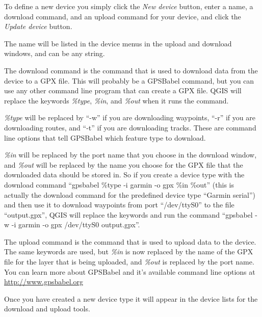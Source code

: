 To define a new device you simply click the \emph{New device} button,
enter a name, a download command, and an upload command for your device,
and click the \emph{Update device} button. 

The name will be listed in the device menus in the upload and download
windows, and can be any string. 

The download command is the command that is used to download data
from the device to a GPX file. This will probably be a GPSBabel command,
but you can use any other command line program that can create a GPX
file. QGIS will replace the keywords \emph{\%type}, \emph{\%in}, and
\emph{\%out} when it runs the command.

\emph{\%type} will be replaced by {}``-w'' if you are downloading
waypoints, {}``-r'' if you are downloading routes, and {}``-t''
if you are downloading tracks. These are command line options that
tell GPSBabel which feature type to download. 

\emph{\%in} will be replaced by the port name that you choose in the
download window, and \emph{\%out} will be replaced by the name you
choose for the GPX file that the downloaded data should be stored
in. So if you create a device type with the download command {}``gpsbabel
\%type -i garmin -o gpx \%in \%out'' (this is actually the download
command for the predefined device type {}``Garmin serial'') and
then use it to download waypoints from port {}``/dev/ttyS0'' to
the file {}``output.gpx'', QGIS will replace the keywords and run
the command {}``gpsbabel -w -i garmin -o gpx /dev/ttyS0 output.gpx''.

The upload command is the command that is used to upload data to the
device. The same keywords are used, but \emph{\%in} is now replaced
by the name of the GPX file for the layer that is being uploaded,
and \emph{\%out} is replaced by the port name. You can learn more
about GPSBabel and it's available command line options at \url{http://www.gpsbabel.org}

Once you have created a new device type it will appear in the device
lists for the download and upload tools.
